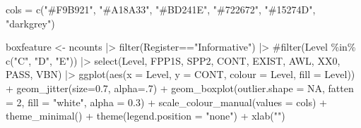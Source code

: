 \documentclass[
  letterpaper,
  DIV=11,
  numbers=noendperiod]{scrreprt}
\newenvironment{Shaded}{\begin{snugshade}}{\end{snugshade}}
\newcommand{\AttributeTok}[1]{\textcolor[rgb]{0.40,0.45,0.13}{#1}}
\newcommand{\CommentTok}[1]{\textcolor[rgb]{0.37,0.37,0.37}{#1}}
\newcommand{\ConstantTok}[1]{\textcolor[rgb]{0.56,0.35,0.01}{#1}}
\newcommand{\DecValTok}[1]{\textcolor[rgb]{0.68,0.00,0.00}{#1}}
\newcommand{\FloatTok}[1]{\textcolor[rgb]{0.68,0.00,0.00}{#1}}
\newcommand{\FunctionTok}[1]{\textcolor[rgb]{0.28,0.35,0.67}{#1}}
\newcommand{\NormalTok}[1]{\textcolor[rgb]{0.00,0.23,0.31}{#1}}
\newcommand{\OtherTok}[1]{\textcolor[rgb]{0.00,0.23,0.31}{#1}}
\newcommand{\SpecialCharTok}[1]{\textcolor[rgb]{0.37,0.37,0.37}{#1}}
\newcommand{\StringTok}[1]{\textcolor[rgb]{0.13,0.47,0.30}{#1}}
\begin{document}
\begin{Shaded}
\begin{Highlighting}[]
\NormalTok{cols }\OtherTok{=} \FunctionTok{c}\NormalTok{(}\StringTok{"\#F9B921"}\NormalTok{, }\StringTok{"\#A18A33"}\NormalTok{, }\StringTok{"\#BD241E"}\NormalTok{, }\StringTok{"\#722672"}\NormalTok{, }\StringTok{"\#15274D"}\NormalTok{, }\StringTok{"darkgrey"}\NormalTok{)}

\NormalTok{boxfeature }\OtherTok{\textless{}{-}}\NormalTok{ ncounts }\SpecialCharTok{|\textgreater{}} 
  \FunctionTok{filter}\NormalTok{(Register}\SpecialCharTok{==}\StringTok{"Informative"}\NormalTok{) }\SpecialCharTok{|\textgreater{}} 
  \CommentTok{\#filter(Level \%in\% c("C", "D", "E")) |\textgreater{} }
  \FunctionTok{select}\NormalTok{(Level, FPP1S, SPP2, CONT, EXIST, AWL, XX0, PASS, VBN) }\SpecialCharTok{|\textgreater{}} 
  \FunctionTok{ggplot}\NormalTok{(}\FunctionTok{aes}\NormalTok{(}\AttributeTok{x =}\NormalTok{ Level, }\AttributeTok{y =}\NormalTok{ CONT, }\AttributeTok{colour =}\NormalTok{ Level, }\AttributeTok{fill =}\NormalTok{ Level)) }\SpecialCharTok{+}
  \FunctionTok{geom\_jitter}\NormalTok{(}\AttributeTok{size=}\FloatTok{0.7}\NormalTok{, }\AttributeTok{alpha=}\NormalTok{.}\DecValTok{7}\NormalTok{) }\SpecialCharTok{+}
  \FunctionTok{geom\_boxplot}\NormalTok{(}\AttributeTok{outlier.shape =} \ConstantTok{NA}\NormalTok{, }\AttributeTok{fatten =} \DecValTok{2}\NormalTok{, }\AttributeTok{fill =} \StringTok{"white"}\NormalTok{, }\AttributeTok{alpha =} \FloatTok{0.3}\NormalTok{) }\SpecialCharTok{+}
  \FunctionTok{scale\_colour\_manual}\NormalTok{(}\AttributeTok{values =}\NormalTok{ cols) }\SpecialCharTok{+}
  \FunctionTok{theme\_minimal}\NormalTok{() }\SpecialCharTok{+}
  \FunctionTok{theme}\NormalTok{(}\AttributeTok{legend.position =} \StringTok{"none"}\NormalTok{) }\SpecialCharTok{+}
  \FunctionTok{xlab}\NormalTok{(}\StringTok{""}\NormalTok{)}


\end{Highlighting}
\end{Shaded}
\end{document}
